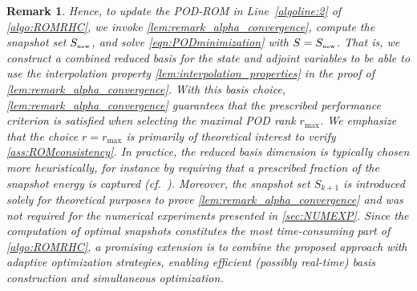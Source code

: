 \documentclass{m2an}
\newtheorem{remark}[thrm]{Remark}
\begin{document}
{
\begin{remark}\label{rem:pod_update}
%
Hence, to update the POD-ROM in Line~\ref{algoline:2} of \cref{algo:ROMRHC}, we invoke
\cref{lem:remark_alpha_convergence}, compute the snapshot set
\(S_{\text{\tiny new}}\), and solve \eqref{eqn:PODminimization} with
\(S = S_{\text{\tiny new}}\). That is, we construct a combined reduced basis for the state and adjoint variables to be able to use the interpolation property \cref{lem:interpolation_properties} in the proof of \cref{lem:remark_alpha_convergence}. With this basis choice, \cref{lem:remark_alpha_convergence} guarantees that the prescribed performance criterion is satisfied when selecting the maximal POD rank \(r_{\max}\).
We emphasize that the choice \(r = r_{\max}\) is primarily of theoretical interest to
verify \cref{ass:ROMconsistency}. In practice, the reduced basis dimension is typically
chosen more heuristically, for instance by requiring that a prescribed
fraction of the snapshot energy is captured (cf.~\cite{GubV17}).
Moreover, the snapshot set \(S_{k+1}\) is introduced solely for theoretical purposes to
prove \cref{lem:remark_alpha_convergence} and was not required for the numerical
experiments presented in \cref{sec:NUMEXP}.
Since the computation of optimal snapshots constitutes the most time-consuming part of
\cref{algo:ROMRHC}, a promising extension is to combine the proposed approach with adaptive
optimization strategies, enabling efficient (possibly real-time) basis construction and
simultaneous optimization.
\end{remark}
}
%
\end{document}
